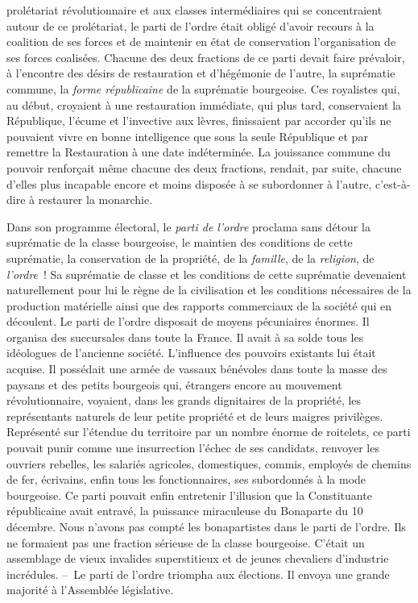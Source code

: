 \documentclass[twoside]{book} %
\begin{document}
prolétariat révolutionnaire et aux classes intermédiaires qui se concentraient autour de ce prolétariat, le parti de l’ordre était obligé d’avoir recours à la coalition de ses forces et de maintenir en état de conservation l’organisation de ses forces coalisées. Chacune des deux fractions de ce parti devait faire prévaloir, à l’encontre des désirs de restauration et d’hégémonie de l’autre, la suprématie commune, la \emph{forme républicaine} de la suprématie bourgeoise. Ces royalistes qui, au début, croyaient à une restauration immédiate, qui plus tard, conservaient la République, l’écume et l’invective aux lèvres, finissaient par accorder qu’ils ne pouvaient vivre en bonne intelligence que sous la seule République et par remettre la Restauration à une date indéterminée. La jouissance commune du pouvoir renforçait même chacune des deux fractions, rendait, par suite, chacune d’elles plus incapable encore et moins disposée à se subordonner à l’autre, c’est-à-dire à restaurer la monarchie.\par
Dans son programme électoral, le \emph{parti de l’ordre} proclama sans détour la suprématie de la classe bourgeoise, le maintien des conditions de cette suprématie, la conservation de la propriété, de la \emph{famille}, de la \emph{religion}, de \emph{l’ordre} ! Sa suprématie de classe et les conditions de cette suprématie devenaient naturellement pour lui le règne de la civilisation et les conditions nécessaires de la production matérielle ainsi que des rapports commerciaux de la société qui en découlent. Le parti de l’ordre disposait de moyens pécuniaires énormes. Il organisa des succursales dans toute la France. Il avait à sa solde tous les idéologues de l’ancienne société. L’influence des pouvoirs existants lui était acquise. Il possédait une armée de vassaux bénévoles dans toute la masse des paysans et des petits bourgeois qui, étrangers encore au mouvement révolutionnaire, voyaient, dans les grands dignitaires de la propriété, les représentants naturels de leur petite propriété et de leurs maigres privilèges. Représenté sur l’étendue du territoire par un nombre énorme de roitelets, ce parti pouvait punir comme une insurrection l’échec de ses candidats, renvoyer les ouvriers rebelles, les salariés agricoles, domestiques, commis, employés de chemins de fer, écrivains, enfin tous les fonctionnaires, ses subordonnés à la mode bourgeoise. Ce parti pouvait enfin entretenir l’illusion que la Constituante républicaine avait entravé, la puissance miraculeuse du Bonaparte du 10 décembre. Nous n’avons pas compté les bonapartistes dans le parti de l’ordre. Ils ne formaient pas une fraction sérieuse de la classe bourgeoise. C’était un assemblage de vieux invalides superstitieux et de jeunes chevaliers d’industrie incrédules. – Le parti de l’ordre triompha aux élections. Il envoya une grande majorité à l’Assemblée législative.\par
\end{document}
